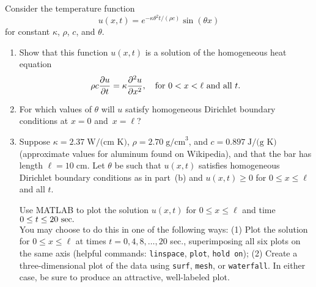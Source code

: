Consider the temperature function
\[ u(x,t) = e^{-\kappa \theta^2 t/(\rho c)} \sin(\theta x) \]
for constant $\kappa$, $\rho$, $c$, and $\theta$.
\begin{enumerate}
\item Show that this function $u(x,t)$ is a solution of the homogeneous heat equation
 \[  \rho c {{\partial} u \over {\partial} t} = \kappa {{\partial}^2 u\over {\partial}x^2}, 
       \quad \mbox{for $0<x<\ell$ and all $t$.}\]

\item For which values of $\theta$ will $u$ satisfy 
      homogeneous Dirichlet boundary conditions at $x=0$ and~$x=\ell$?

\item Suppose $\kappa = 2.37\;\mbox{W/(cm K)}$,
      $\rho = 2.70\;\mbox{g/cm}^3$, and $c = 0.897\; \mbox{J/(g K)}$
      (approximate values for aluminum found on Wikipedia),
      and that the bar has length $\ell = 10\;\mbox{cm}$.
      Let $\theta$ be such that $u(x,t)$ satisfies
      homogeneous Dirichlet boundary conditions as in part~(b)
      and $u(x,t)\ge 0$ for $0\le x\le \ell$ and all $t$.
 
\vspace*{.25em} 
      Use MATLAB to plot the solution $u(x,t)$ for $0\le x\le \ell$
      and time $0\le t\le 20~{\rm sec}.$\\
      You may choose to do this in one of the following ways:
        (1) Plot the solution for $0\le x\le \ell$ at times
         $t = 0, 4, 8, \ldots, 20$ sec., superimposing all
         six plots on the same axis (helpful commands:
         \verb|linspace|, \verb|plot|, \verb|hold on|);
        (2) Create a three-dimensional plot of the data 
         using \verb|surf|, \verb|mesh|, or \verb|waterfall|.
        In either case, be sure to produce an attractive,
        well-labeled plot.

\end{enumerate}




